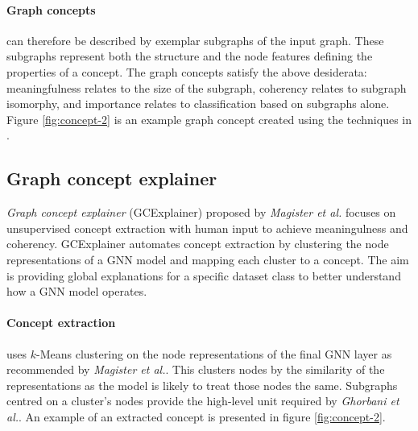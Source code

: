 
\paragraph{Graph concepts} can therefore be described by exemplar subgraphs of the input graph.
These subgraphs represent both the structure and the node features defining the properties of a concept.
The graph concepts satisfy the above desiderata: meaningfulness relates to the size of the subgraph, coherency relates to subgraph isomorphy, and importance relates to classification based on subgraphs alone.
Figure \ref{fig:concept-2} is an example graph concept created using the techniques in .



\subsection{Graph concept explainer}
\label{sec:GCE}



\emph{Graph concept explainer} (GCExplainer) proposed by \textit{Magister et al.}\cite{magister2021gcexplainer} focuses on unsupervised concept extraction with human input to achieve meaningulness and coherency.
GCExplainer automates concept extraction by clustering the node representations of a GNN model and mapping each cluster to a concept.
The aim is providing global explanations for a specific dataset class to better understand how a GNN model operates.



\paragraph{Concept extraction}
uses $k$-Means clustering on the node representations of the final GNN layer as recommended by \textit{Magister et al.}\cite{magister2021gcexplainer}.
This clusters nodes by the similarity of the representations as the model is likely to treat those nodes the same.
Subgraphs centred on a cluster's nodes provide the high-level unit required by \textit{Ghorbani et al.}\cite{ghorbani2019towards}.
An example of an extracted concept is presented in figure \ref{fig:concept-2}.

